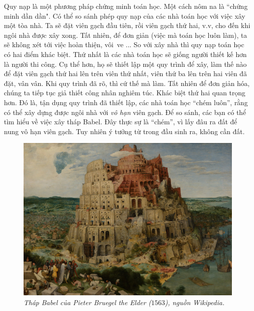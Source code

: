 \begin{multicols}{2}	
	Quy nạp là một phương pháp chứng minh toán học. Một cách nôm na là ``chứng minh dần dần". Có thể so sánh phép quy nạp của các nhà toán học với việc xây một tòa nhà. Ta sẽ đặt viên gạch đầu tiên, rồi viên gạch thứ hai, v.v, cho đến khi ngôi nhà được xây xong. Tất nhiên, để đơn giản (việc mà toán học luôn làm), ta sẽ không xét tới việc hoàn thiện, vôi~ve ... 
	\vskip 0.1cm
	So với xây nhà thì quy nạp toán học có hai điểm khác biệt. Thứ nhất là các nhà toán học sẽ giống người thiết kế hơn là người thi công. Cụ thể hơn, họ sẽ thiết lập một quy trình để xây, làm thế nào để đặt viên gạch thứ hai lên trên viên thứ nhất, viên thứ ba lên trên hai viên đã đặt, vân vân. Khi quy trình đã rõ, thì cứ thế mà làm. Tất nhiên để đơn giản hóa, chúng ta tiếp tục giả thiết công nhân \linebreak nghiêm túc.
	\vskip 0.1cm
	Khác biệt thứ hai quan trọng hơn. Đó là, tận dụng quy trình đã thiết lập, các nhà toán học ``chém luôn'', rằng có thể xây dựng được ngôi nhà với {\em vô hạn} viên gạch. Để so sánh, các bạn có thể tìm hiểu về việc xây tháp Babel. Đây thực sự là ``chém'', vì lấy đâu ra đất để nung vô hạn viên gạch. Tuy nhiên ý tưởng từ trong đầu sinh ra, không cần đất. 
		\begin{figure}[H]
		\vspace*{-5pt}
		\centering
		\captionsetup{labelformat= empty, justification=centering}
		\includegraphics[width=1\linewidth]{111}
		\caption{\small\textit{\color{quantoan}Tháp Babel của Pieter Bruegel the Elder ($1563$), nguồn Wikipedia.}}
		\vspace*{-10pt}
	\end{figure}

\end{multicols}
